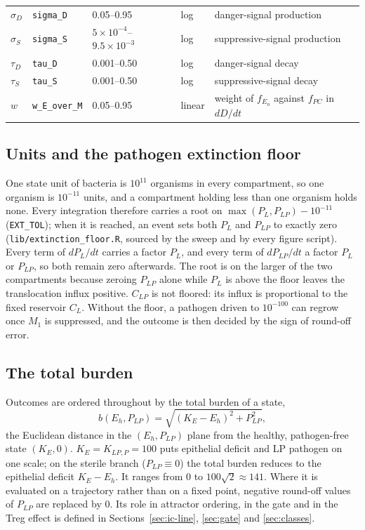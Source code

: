 \documentclass[11pt]{article}
\begin{document}
\begin{table}[H]
{\begin{tabular}{lllll}
$\sigma_D$ & \texttt{sigma\_D} & 0.05--0.95 & log & danger-signal production\\
$\sigma_S$ & \texttt{sigma\_S} & $5\times10^{-4}$--$9.5\times10^{-3}$ & log & suppressive-signal production\\
$\tau_D$ & \texttt{tau\_D} & 0.001--0.50 & log & danger-signal decay\\
$\tau_S$ & \texttt{tau\_S} & 0.001--0.50 & log & suppressive-signal decay\\
$w$ & \texttt{w\_E\_over\_M} & 0.05--0.95 & linear & weight of $f_{E_n}$ against $f_{PC}$ in $dD/dt$\\
\bottomrule
\end{tabular}}
\end{table}

\subsection{Units and the pathogen extinction floor}
\label{sec:units}

One state unit of bacteria is
$10^{11}$ organisms in every compartment, so one organism is $10^{-11}$ units, and a
compartment holding less than one organism holds none. Every integration therefore
carries a root on $\max(P_L, P_{LP}) - 10^{-11}$ (\texttt{EXT\_TOL}); when it is
reached, an event sets both $P_L$ and $P_{LP}$ to exactly zero
(\texttt{lib/extinction\_floor.R}, sourced by the sweep and by every figure script).
Every term of $dP_L/dt$ carries a factor $P_L$, and every term of $dP_{LP}/dt$ a factor
$P_L$ or $P_{LP}$, so both remain zero afterwards. The root is on the larger of the two
compartments because zeroing $P_{LP}$ alone while $P_L$ is above the floor leaves the
translocation influx positive. $C_{LP}$ is not floored: its influx is proportional to
the fixed reservoir $C_L$. Without the floor, a pathogen driven to $10^{-100}$ can
regrow once $M_1$ is suppressed, and the outcome is then decided by the sign of
round-off error.

\subsection{The total burden}
\label{sec:burden}

Outcomes are ordered throughout by the total burden of a state,
\begin{equation}
b(E_h, P_{LP}) = \sqrt{(K_E - E_h)^2 + P_{LP}^2},
\label{eq:burden}
\end{equation}
the Euclidean distance in the $(E_h, P_{LP})$ plane from the healthy, pathogen-free
state $(K_E, 0)$. $K_E = K_{LP,P} = 100$ puts epithelial deficit and LP pathogen on one
scale; on the sterile branch ($P_{LP} \equiv 0$) the total burden reduces to the
epithelial deficit $K_E - E_h$. It ranges from 0 to $100\sqrt2 \approx 141$. Where it is
evaluated on a trajectory rather than on a fixed point, negative round-off values of
$P_{LP}$ are replaced by 0. Its role in attractor ordering, in the gate and in the Treg
effect is defined in Sections~\ref{sec:ic-line}, \ref{sec:gate} and \ref{sec:classes}.
\end{document}
